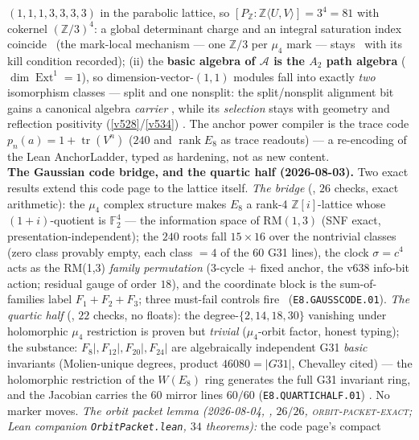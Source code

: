 \documentclass[11pt,a4paper]{article}
\newcommand{\Z}{\mathbb{Z}}
\theoremstyle{definition}
\begin{document}
\begin{winbox}
$(1,1,1,3,3,3,3)$ in the parabolic lattice, so $[P_{\Z}:\Z\langle U,V\rangle]=3^4=81$ with cokernel
$(\Z/3)^4$: a global determinant charge and an integral saturation index coincide \mE\ (the
mark-local mechanism --- one $\Z/3$ per $\mu_4$ mark --- stays \mO\ with its kill condition
recorded); (ii) the \textbf{basic algebra of $\mathcal A$ is the $A_2$ path algebra}
($\dim\operatorname{Ext}^1=1$), so dimension-vector-$(1,1)$ modules fall into exactly \emph{two}
isomorphism classes --- split and one nonsplit: the split/nonsplit alignment bit gains a canonical
algebra \emph{carrier} \mE, while its \emph{selection} stays with geometry and reflection positivity
(\vref{v528}/\vref{v534}) \mC.  The anchor power compiler is the trace code $p_n(a)=1+
\operatorname{tr}(V^n)$ ($240$ and $\operatorname{rank}E_8$ as trace readouts) --- a re-encoding of
the Lean AnchorLadder, typed as hardening, not as new content.
\smallskip\\
\noindent\textbf{The Gaussian code bridge, and the quartic half (2026-08-03).}
Two exact results extend this code page to the lattice itself.
\emph{The bridge} (, $26$ checks,
exact arithmetic): the $\mu_4$ complex structure makes $E_8$ a rank-4
$\Z[i]$-lattice whose $(1+i)$-quotient is $\mathbb F_2^4$ --- the
information space of $\mathrm{RM}(1,3)$ (SNF exact,
presentation-independent); the $240$ roots fall $15\times16$ over the
nontrivial classes (zero class provably empty, each class $=4$ of the
$60$ G31 lines), the clock $\sigma=c^4$ acts as the RM(1,3)
\emph{family permutation} (3-cycle $+$ fixed anchor, the v638
info-bit action; residual gauge of order $18$), and the coordinate
block is the sum-of-families label $F_1{+}F_2{+}F_3$; three
must-fail controls fire \mE\ (\texttt{E8.GAUSSCODE.01}).  \emph{The
quartic half} (, $22$ checks, no
floats): the degree-$\{2,14,18,30\}$ vanishing under holomorphic
$\mu_4$ restriction is proven but \emph{trivial} ($\mu_4$-orbit
factor, honest typing); the substance: $F_8|,F_{12}|,F_{20}|,F_{24}|$
are algebraically independent G31 \emph{basic} invariants (Molien-unique
degrees, product $46080=|G31|$, Chevalley cited) --- the holomorphic
restriction of the $W(E_8)$ ring generates the full G31 invariant
ring, and the Jacobian carries the $60$ mirror lines $60/60$
(\texttt{E8.QUARTICHALF.01}) \mE.  No marker moves.
\emph{The orbit packet lemma (2026-08-04,
, $26/26$,
\textsc{orbit-packet-exact}; Lean companion
\texttt{OrbitPacket.lean}, $34$ theorems):} the code page's compact

\end{winbox}
\end{document}

